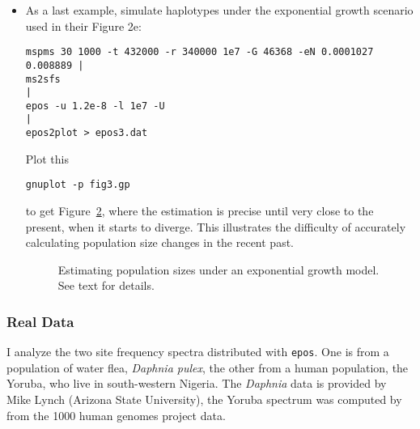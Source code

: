 \documentclass[a4paper, english]{article}
\newcommand{\ty}{\texttt}
\begin{document}
\begin{itemize}
\begin{verbatim}
gnuplot -p scripts/fig2.gp
\end{verbatim}
to get Figure~\ref{fig:2b}. The fit between the median estimated
population size and its true value remains excellent. However, the
variation in estimates is again large, particularly toward the present.
\begin{figure}
  \begin{center}
    \scalebox{0.6}{}
  \end{center}
  \caption{Estimating population sizes under a model with one
    instantaneous size change. See text for details.}\label{fig:2b}
\end{figure}
\item As a last example, simulate haplotypes under
  the exponential growth scenario \cite{liu15:exp} used in their
  Figure 2e:
    \small
\begin{verbatim}
mspms 30 1000 -t 432000 -r 340000 1e7 -G 46368 -eN 0.0001027 0.008889 |
ms2sfs                                                                |
epos -u 1.2e-8 -l 1e7 -U                                              |
epos2plot > epos3.dat
\end{verbatim}
\normalsize
Plot this
\begin{verbatim}
gnuplot -p fig3.gp
\end{verbatim}
to get Figure~\ref{fig:2e}, where the estimation is precise until very
close to the present, when it starts to diverge. This illustrates
the difficulty of accurately calculating population size changes
in the recent past.
\begin{figure}
  \begin{center}
    \scalebox{0.6}{}
  \end{center}
  \caption{Estimating population sizes under an exponential growth
    model. See text for details.}\label{fig:2e}
\end{figure}
\end{itemize}

\subsubsection*{Real Data}
I analyze the two site frequency spectra distributed with
\ty{epos}. One is from a population of water flea, \textit{Daphnia
  pulex}, the other from a human population, the Yoruba, who live in
south-western Nigeria. The \textit{Daphnia} data is provided by Mike
Lynch (Arizona State University), the Yoruba spectrum was computed by
\cite{lap17:acc} from the 1000 human genomes project data.
\end{document}

